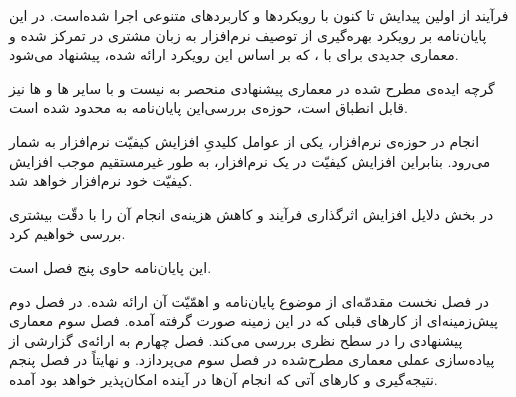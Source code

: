 	
فرآیند  از اولین پیدایش تا کنون با رویکرد‌ها و کاربردهای
متنوعی اجرا شده‌است. در این پایان‌نامه بر رویکرد بهره‌گیری از توصیف
نرم‌افزار به زبان مشتری در  تمرکز شده و معماری‌ جدیدی برای
 با  ، که بر اساس این رویکرد
ارائه شده، پیشنهاد می‌شود.

گرچه ایده‌ی مطرح شده در معماری پیشنهادی منحصر به 
 نیست و با سایر ‌ها و ‌ها نیز
قابل انطباق است، حوزه‌ی بررسی‌این پایان‌نامه به 
 محدود شده است.



انجام  در حوزه‌ی نرم‌افزار، یکی از عوامل کلیدیِ افزایش کیفیّت نرم‌افزار به شمار می‌رود. بنابراین افزایش کیفیّت  در یک نرم‌افزار، به طور غیرمستقیم موجب افزایش کیفیّت خود نرم‌افزار خواهد شد.

در بخش  دلایل افزایش اثرگذاری فرآیند  و کاهش هزینه‌ی انجام آن را با دقّت بیشتری بررسی خواهیم کرد.





این پایان‌نامه حاوی پنج فصل است.

در فصل نخست مقدمّه‌ای از موضوع پایان‌نامه و اهمّیّت آن ارائه شده. در فصل دوم پیش‌زمینه‌ای از کارهای قبلی که در این زمینه صورت گرفته آمده. فصل سوم معماری پیشنهادی را در سطح نظری بررسی می‌کند. فصل چهارم به ارائه‌ی گزارشی از پیاده‌سازی عملی معماری مطرح‌شده در فصل سوم می‌پردازد. و نهایتاً در فصل پنجم نتیجه‌گیری و کارهای آتی که انجام آن‌ها در آینده امکان‌پذیر خواهد بود آمده.

